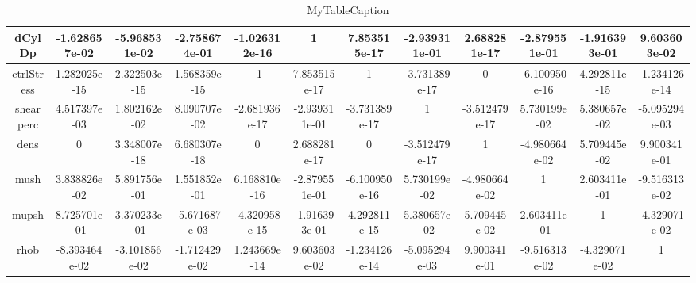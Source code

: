 \begin{table}[H!]
\begin{tabular}{|c|c|c|c|c|c|c|c|c|c|c|c|}
dCylDp & -1.628657e-02 & -5.968531e-02 & -2.758674e-01 & -1.026312e-16 & 1 & 7.853515e-17 & -2.939311e-01 & 2.688281e-17 & -2.879551e-01 & -1.916393e-01 & 9.603603e-02 \\ 
\hline                                                                                                                                                                     
ctrlStress & 1.282025e-15 & 2.322503e-15 & 1.568359e-15 & -1 & 7.853515e-17 & 1 & -3.731389e-17 & 0 & -6.100950e-16 & 4.292811e-15 & -1.234126e-14 \\                      
\hline                                                                                                                                                                     
shearperc & 4.517397e-03 & 1.802162e-02 & 8.090707e-02 & -2.681936e-17 & -2.939311e-01 & -3.731389e-17 & 1 & -3.512479e-17 & 5.730199e-02 & 5.380657e-02 & -5.095294e-03 \\
\hline                                                                                                                                                                     
dens & 0 & 3.348007e-18 & 6.680307e-18 & 0 & 2.688281e-17 & 0 & -3.512479e-17 & 1 & -4.980664e-02 & 5.709445e-02 & 9.900341e-01 \\                                         
\hline                                                                                                                                                                     
mush & 3.838826e-02 & 5.891756e-01 & 1.551852e-01 & 6.168810e-16 & -2.879551e-01 & -6.100950e-16 & 5.730199e-02 & -4.980664e-02 & 1 & 2.603411e-01 & -9.516313e-02 \\      
\hline                                                                                                                                                                     
mupsh & 8.725701e-01 & 3.370233e-01 & -5.671687e-03 & -4.320958e-15 & -1.916393e-01 & 4.292811e-15 & 5.380657e-02 & 5.709445e-02 & 2.603411e-01 & 1 & -4.329071e-02 \\     
\hline                                                                                                                                                                     
rhob & -8.393464e-02 & -3.101856e-02 & -1.712429e-02 & 1.243669e-14 & 9.603603e-02 & -1.234126e-14 & -5.095294e-03 & 9.900341e-01 & -9.516313e-02 & -4.329071e-02 & 1 \\   
\hline                                                                                                                                                                     
\end{tabular}                                                                                                                                                              
\caption{MyTableCaption}                                                                                                                                                   
\label{table:MyTableLabel}                                                                                                                                                 
\end{table}               